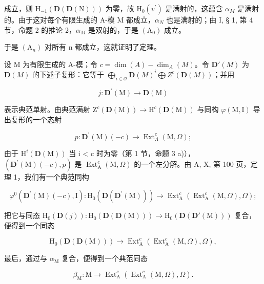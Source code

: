 成立，则 \(\mathrm{H}_{-1}(\mathbf{D}(\mathbf{D}(\mathrm{N})))\) 为零，故 \(\mathrm{H}_{0}(v^{\prime})\) 是满射的，这蕴含 \(\alpha_{M}\) 是满射的。由于这对每个有限生成的 A-模 M 都成立，\(\alpha_{N}\) 也是满射的；由 I, § 1, 第 4 节，命题 2 的推论 2，\(\alpha_{M}\) 是双射的，于是 \((\mathrm{A}_{0})\) 成立。

于是 \((\mathrm{A}_{n})\) 对所有 n 都成立，这就证明了定理。

设 M 为有限生成的 A-模；令 \(c = \dim(A) - \dim_{A}(M)\)。令 \(\mathbf{D}'(M)\) 为 \(\mathbf{D}(M)\) 的下述子复形：它等于 \(\bigoplus_{i\in\mathcal{O}}\mathbf{D}(M)^{i}\bigoplus Z^{c}(\mathbf{D}(M))\)；并用

\[
j: \mathbf {D} ^ {\prime} (\mathrm{M}) \rightarrow \mathbf {D} (\mathrm{M})
\]

表示典范单射。由典范满射 \(\mathrm{Z}^{c}(\mathbf{D}(\mathrm{M}))\to\mathrm{H}^{c}(\mathbf{D}(\mathrm{M}))\) 与同构 \(\varphi(\mathrm{M},\mathrm{I})\) 导出复形的一个态射

\[
p: \mathbf {D} ^ {\prime} (\mathrm{M}) (- c) \rightarrow \operatorname{Ext} _ {\Lambda} ^ {c} (\mathrm{M}, \Omega);
\]

由于 \(\mathrm{H}^{i}(\mathbf{D}(\mathrm{M}))\) 当 i \textless{} c 时为零（第 1 节，命题 3 a)），\((\mathbf{D}^{\prime}(\mathrm{M})(-c), p)\) 是 \(\operatorname{Ext}_{\mathrm{A}}^{c}(\mathrm{M}, \Omega)\) 的一个左分解。由 A, X, 第 100 页，定理 1，我们有一个典范同构

\[
\varphi^ {0} \left(\mathbf {D} ^ {\prime} (\mathrm{M}) (- c), \mathrm{I}\right): \mathrm{H} _ {0} \left(\mathbf {D} \left(\mathbf {D} ^ {\prime} (\mathrm{M})\right)\right) \longrightarrow \operatorname{Ext} _ {\mathrm{A}} ^ {c} \left(\operatorname{Ext} _ {\mathrm{A}} ^ {c} (\mathrm{M}, \Omega), \Omega\right);
\]

把它与同态 \(\mathrm{H}_{0}(\mathbf{D}(j)) : \mathrm{H}_{0}(\mathbf{D}(\mathbf{D}(\mathrm{M}))) \to \mathrm{H}_{0}(\mathbf{D}(\mathbf{D}'(\mathrm{M})))\) 复合，便得到一个同态

\[
\mathrm{H} _ {0} (\mathbf {D} (\mathbf {D} (\mathrm{M}))) \longrightarrow \operatorname{Ext} _ {\mathrm{A}} ^ {c} \left(\operatorname{Ext} _ {\mathrm{A}} ^ {c} (\mathrm{M}, \Omega), \Omega\right),
\]

最后，通过与 \(\alpha_{\mathrm{M}}\) 复合，便得到一个典范同态

\[
\beta_ {\mathrm{M}}: \mathrm{M} \longrightarrow \operatorname{Ext} _ {\mathrm{A}} ^ {c} (\operatorname{Ext} _ {\mathrm{A}} ^ {c} (\mathrm{M}, \Omega), \Omega).
\]

